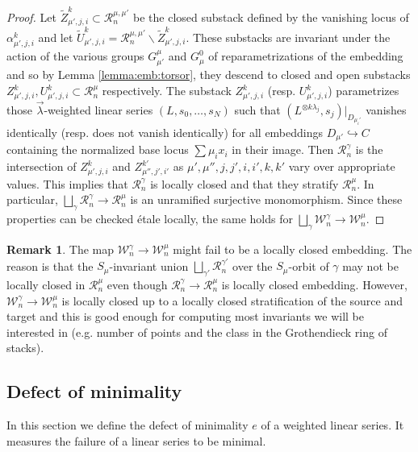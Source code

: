 \documentclass[a4paper,12pt]{amsart}
\theoremstyle{definition}
\newtheorem{rmk}[thm]{Remark}
\newcommand{\cW}{\mathcal{W}}
\newcommand{\cR}{\mathcal{R}}
\newcommand{\lambdavec}{{\vec{\lambda}}}
\begin{document}
\begin{proof}
		Let $\tilde{Z}_{\mu',j,i}^k\subset\cR^{\mu,\mu'}_n$ be the closed substack defined by the vanishing locus of $\alpha_{\mu',j,i}^k$ and let $\tilde{U}_{\mu',j,i}^k=\cR^{\mu,\mu'}_n\smallsetminus \tilde{Z}_{\mu',j,i}^k$. These substacks are invariant under the action of the various groups $G^{\mu}_{\mu'}$ and $G^0_{\mu}$ of reparametrizations of the embedding and so by Lemma \ref{lemma:emb:torsor}, they descend to closed and open substacks $Z_{\mu',j,i}^k,U_{\mu',j,i}^k \subset \cR^{\mu}_n$ respectively. The substack $Z_{\mu',j,i}^k$ (resp. $U_{\mu',j,i}^k$) parametrizes those $\lambdavec$-weighted linear series $(L, s_0, \ldots, s_N)$ such that $(L^{\otimes k\lambda_j},s_j)|_{D_{\mu_i'}}$ vanishes identically (resp. does not vanish identically) for all embeddings $D_{\mu'} \hookrightarrow C$ containing the normalized base locus $\sum \mu_i x_i$ in their image. Then $\cR_n^{\gamma}$ is the intersection of $Z_{\mu',j,i}^k$ and $Z_{\mu'',j',i'}^{k'}$ as $\mu',\mu'',j,j',i,i',k,k'$ vary over appropriate values. This implies that $\cR_n^{\gamma}$ is locally closed and that they stratify $\cR_n^\mu$. In particular, $\bigsqcup_{\gamma} \cR^\gamma_n \to \cR^\mu_n$ is an unramified surjective monomorphism. Since these properties can be checked \'etale locally, the same holds for $\bigsqcup_\gamma \cW^\gamma_n \to \cW^\mu_n$.
	\end{proof} 
	
	\begin{rmk}
		The map $\cW_n^\gamma \to \cW_n^\mu$ might fail to be a locally closed embedding. The reason is that the $S_\mu$-invariant union $\bigsqcup_{\gamma'} \cR^{\gamma'}_n$ over the $S_\mu$-orbit of $\gamma$ may not be locally closed in $\cR^\mu_n$ even though $\cR^\gamma_n \to \cR^\mu_n$ is locally closed embedding. However, $\cW_n^\gamma \to \cW_n^\mu$ is locally closed up to a locally closed stratification of the source and target and this is good enough for computing most invariants we will be interested in (e.g. number of points and the class in the Grothendieck ring of stacks). 
	\end{rmk}
	
	\subsection{Defect of minimality} 
	
	In this section we define the defect of minimality $e$ of a weighted linear series. It measures the failure of a linear series to be minimal. 
	
\end{document}
